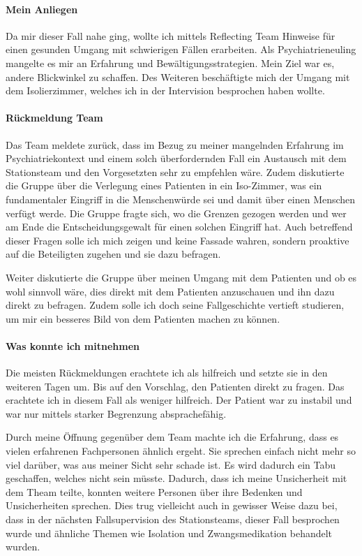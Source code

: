 \paragraph{Mein Anliegen}
Da mir dieser Fall nahe ging, wollte ich mittels Reflecting Team Hinweise für einen gesunden Umgang mit schwierigen Fällen erarbeiten. Als Psychiatrieneuling mangelte es mir an Erfahrung  und Bewältigungsstrategien. Mein Ziel war es, andere Blickwinkel zu schaffen. Des Weiteren beschäftigte mich der Umgang mit dem Isolierzimmer, welches ich in der Intervision besprochen haben wollte. 

\paragraph{Rückmeldung Team}
Das Team meldete zurück, dass im Bezug zu meiner mangelnden Erfahrung im Psychiatriekontext und einem solch überfordernden Fall ein Austausch mit dem Stationsteam und den Vorgesetzten sehr zu empfehlen wäre. Zudem diskutierte die Gruppe über die Verlegung eines Patienten in ein Iso-Zimmer, was ein fundamentaler Eingriff in die Menschenwürde sei und damit über einen Menschen verfügt werde. Die Gruppe fragte sich, wo die Grenzen gezogen werden und wer am Ende die Entscheidungsgewalt für einen solchen Eingriff hat. Auch betreffend dieser Fragen solle ich mich zeigen und keine Fassade wahren, sondern proaktive auf die Beteiligten zugehen und sie dazu befragen. 

Weiter diskutierte die Gruppe über meinen Umgang mit dem Patienten und ob es wohl sinnvoll wäre, dies direkt mit dem Patienten anzuschauen und ihn dazu direkt zu befragen. Zudem solle ich doch seine Fallgeschichte vertieft studieren, um mir ein besseres Bild von dem Patienten machen zu können.

\paragraph{Was konnte ich mitnehmen}
Die meisten Rückmeldungen erachtete ich als hilfreich und setzte sie in den weiteren Tagen um. Bis auf den Vorschlag, den Patienten direkt zu fragen. Das erachtete ich in diesem Fall als weniger hilfreich. Der Patient war zu instabil und war nur mittels starker Begrenzung absprachefähig. 

Durch meine Öffnung gegenüber dem Team machte ich die Erfahrung, dass es vielen erfahrenen Fachpersonen ähnlich ergeht. Sie sprechen einfach nicht mehr so viel darüber, was aus meiner Sicht sehr schade ist. Es wird dadurch ein Tabu geschaffen, welches nicht sein müsste. Dadurch, dass ich meine Unsicherheit mit dem Theam teilte, konnten weitere Personen über ihre Bedenken und Unsicherheiten sprechen. Dies trug vielleicht auch in gewisser Weise dazu bei, dass in der nächsten Fallsupervision des Stationsteams, dieser Fall besprochen wurde und ähnliche Themen wie Isolation und Zwangsmedikation behandelt wurden.


